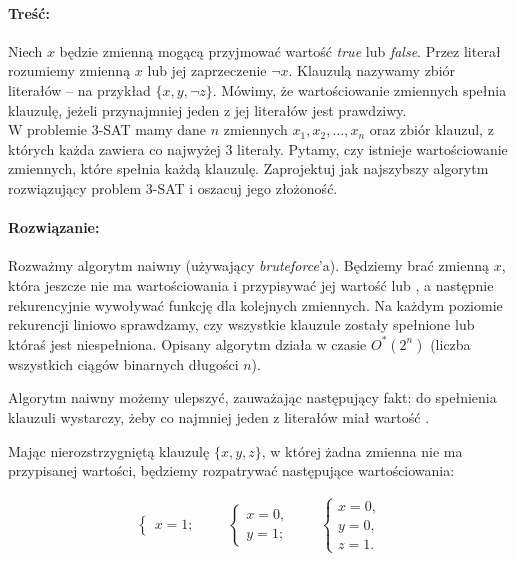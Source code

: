\paragraph{Treść: } Niech $x$ będzie zmienną mogącą przyjmować wartość \textit{true} lub \textit{false}. Przez literał rozumiemy zmienną
$x$ lub jej zaprzeczenie $\lnot x$. Klauzulą nazywamy zbiór literałów -- na przykład $\{x, y, \lnot z\}$. Mówimy, że wartościowanie
zmiennych spełnia klauzulę, jeżeli przynajmniej jeden z jej literałów jest prawdziwy.
\\ W problemie 3-SAT mamy dane $n$ zmiennych $x_1, x_2, \ldots, x_n$ oraz zbiór klauzul, z których każda zawiera co najwyżej
3 literały. Pytamy, czy istnieje wartościowanie zmiennych, które spełnia każdą klauzulę.
Zaprojektuj jak najszybszy algorytm rozwiązujący problem 3-SAT i oszacuj jego złożoność.

\paragraph{Rozwiązanie: } Rozważmy algorytm naiwny (używający \textit{bruteforce}'a). Będziemy brać zmienną $x$, która jeszcze nie ma wartościowania i przypisywać jej wartość \true{} lub \false, a następnie rekurencyjnie wywoływać funkcję dla kolejnych zmiennych. Na każdym poziomie rekurencji liniowo sprawdzamy, czy wszystkie klauzule zostały spełnione lub któraś jest niespełniona. Opisany algorytm działa w czasie $O^*(2^n)$ (liczba wszystkich ciągów binarnych długości $n$).


Algorytm naiwny możemy ulepszyć, zauważając następujący fakt: do spełnienia klauzuli wystarczy, żeby co najmniej jeden z literałów miał wartość \true. 

Mając nierozstrzygniętą klauzulę $\{x, y, z\}$, w której żadna zmienna nie ma przypisanej wartości, będziemy rozpatrywać następujące wartościowania:

\begin{align*}
	\begin{cases}
		x = 1;
	\end{cases}
	\qquad
	\begin{cases}
		x = 0, \\
		y = 1;
	\end{cases}
	\qquad
	\begin{cases}
		x = 0, \\
		y = 0,\\
		z = 1.
	\end{cases}
\end{align*}

